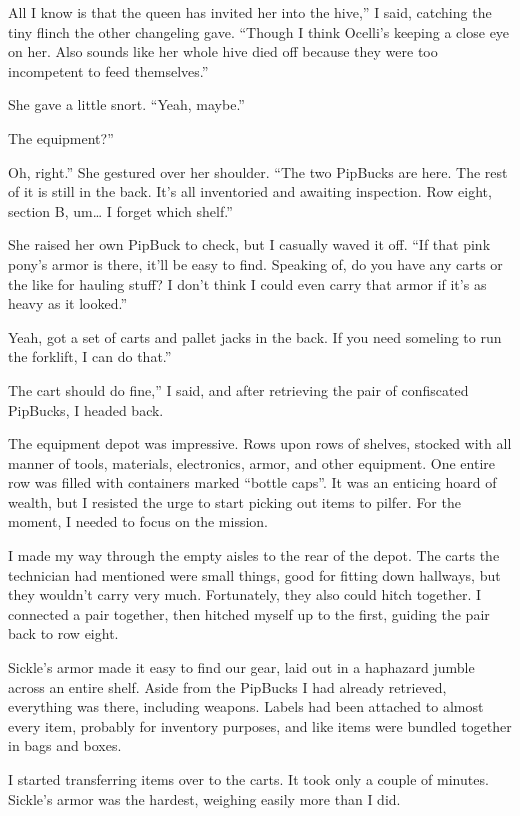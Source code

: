 \leavevmode{}All I know is that the queen has invited her into the hive,” I said, catching the tiny flinch the other changeling gave. “Though I think Ocelli’s keeping a close eye on her. Also sounds like her whole hive died off because they were too incompetent to feed themselves.”

She gave a little snort. “Yeah, maybe.”

\leavevmode{}The equipment?”

\leavevmode{}Oh, right.” She gestured over her shoulder. “The two PipBucks are here. The rest of it is still in the back. It’s all inventoried and awaiting inspection. Row eight, section B, um… I forget which shelf.”

She raised her own PipBuck to check, but I casually waved it off. “If that pink pony’s armor is there, it’ll be easy to find. Speaking of, do you have any carts or the like for hauling stuff? I don’t think I could even carry that armor if it’s as heavy as it looked.”

\leavevmode{}Yeah, got a set of carts and pallet jacks in the back. If you need someling to run the forklift, I can do that.”

\leavevmode{}The cart should do fine,” I said, and after retrieving the pair of confiscated PipBucks, I headed back.

The equipment depot was impressive. Rows upon rows of shelves, stocked with all manner of tools, materials, electronics, armor, and other equipment. One entire row was filled with containers marked “bottle caps”. It was an enticing hoard of wealth, but I resisted the urge to start picking out items to pilfer. For the moment, I needed to focus on the mission.

I made my way through the empty aisles to the rear of the depot. The carts the technician had mentioned were small things, good for fitting down hallways, but they wouldn’t carry very much. Fortunately, they also could hitch together. I connected a pair together, then hitched myself up to the first, guiding the pair back to row eight.

Sickle’s armor made it easy to find our gear, laid out in a haphazard jumble across an entire shelf. Aside from the PipBucks I had already retrieved, everything was there, including weapons. Labels had been attached to almost every item, probably for inventory purposes, and like items were bundled together in bags and boxes.

I started transferring items over to the carts. It took only a couple of minutes. Sickle’s armor was the hardest, weighing easily more than I did.

